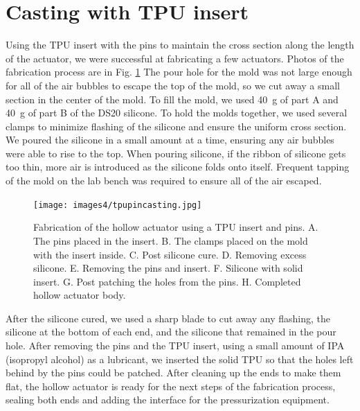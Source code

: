 \section{Casting with TPU insert}
Using the TPU insert with the pins to maintain the cross section along the length of the actuator, we were successful at fabricating a few actuators. Photos of the fabrication process are in Fig. \ref{fig:tpupinfab} The pour hole for the mold was not large enough for all of the air bubbles to escape the top of the mold, so we cut away a small section in the center of the mold. To fill the mold, we used 40~g of part A and 40~g of part B of the DS20 silicone. To hold the molds together, we used several clamps to minimize flashing of the silicone and ensure the uniform cross section. We poured the silicone in a small amount at a time, ensuring any air bubbles were able to rise to the top. When pouring silicone, if the ribbon of silicone gets too thin, more air is introduced as the silicone folds onto itself. Frequent tapping of the mold on the lab bench was required to ensure all of the air escaped. 

\begin{figure}[h]
    \centering
    \texttt{[image: images4/tpupincasting.jpg]}
    \caption{Fabrication of the hollow actuator using a TPU insert and pins. A. The pins placed in the insert. B. The clamps placed on the mold with the insert inside. C. Post silicone cure. D. Removing excess silicone. E. Removing the pins and insert. F. Silicone with solid insert. G. Post patching the holes from the pins. H. Completed hollow actuator body.}
    \label{fig:tpupinfab}
\end{figure}

After the silicone cured, we used a sharp blade to cut away any flashing, the silicone at the bottom of each end, and the silicone that remained in the pour hole. After removing the pins and the TPU insert, using a small amount of IPA (isopropyl alcohol) as a lubricant, we inserted the solid TPU so that the holes left behind by the pins could be patched. After cleaning up the ends to make them flat, the hollow actuator is ready for the next steps of the fabrication process, sealing both ends and adding the interface for the pressurization equipment. 

